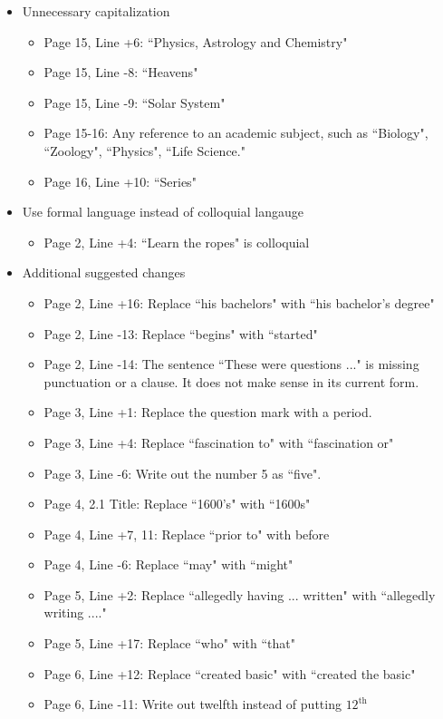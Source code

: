 \documentclass[11pt]{article}
\begin{document}
\begin{itemize}
	\item Unnecessary capitalization
	\begin{itemize}
		\item Page 15, Line +6: ``Physics, Astrology and Chemistry"
		\item Page 15, Line -8: ``Heavens"
		\item Page 15, Line -9: ``Solar System"
		\item Page 15-16: Any reference to an academic subject, such as ``Biology", ``Zoology", ``Physics", ``Life Science."
		\item Page 16, Line +10: ``Series"
	\end{itemize}
	\item Use formal language instead of colloquial langauge
	\begin{itemize}
		\item Page 2, Line +4: ``Learn the ropes" is colloquial
	\end{itemize}
	\item Additional suggested changes
	\begin{itemize}
		\item Page 2, Line +16: Replace ``his bachelors" with ``his bachelor’s degree"
		\item Page 2, Line -13: Replace ``begins" with  ``started" 
		\item Page 2, Line -14: The sentence ``These were questions ..." is missing punctuation or a clause. It does not make sense in its current form.
		\item Page 3, Line +1: Replace the question mark with a period.
		\item Page 3, Line +4: Replace ``fascination to" with ``fascination or"
		\item Page 3, Line -6: Write out the number 5 as ``five".
		\item Page 4, 2.1 Title: Replace ``1600's" with ``1600s"
		\item Page 4, Line +7, 11: Replace ``prior to" with before
		\item Page 4, Line -6: Replace ``may" with ``might"
		\item Page 5, Line +2: Replace ``allegedly having ... written" with ``allegedly writing ...."
		\item Page 5, Line +17: Replace ``who" with ``that"
		\item Page 6, Line +12: Replace ``created basic" with ``created the basic"
		\item Page 6, Line -11: Write out twelfth instead of putting $12^{\text{th}}$

\end{itemize}
\end{itemize}
\end{document}
